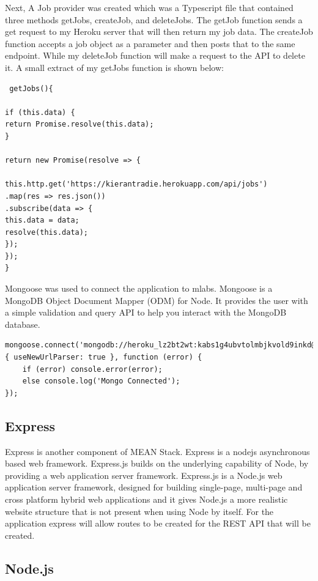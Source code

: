 Next, A Job provider was created which was a Typescript file that contained three methods getJobs, createJob, and deleteJobs. The getJob function sends a get request to my Heroku server that will then return my job data. The createJob function accepts a job object as a parameter and then posts that to the same endpoint. While my deleteJob function will make a request to the API to delete it. A small extract of my getJobs function is shown below:

\begin{verbatim}
 getJobs(){

if (this.data) {
return Promise.resolve(this.data);
}

return new Promise(resolve => {

this.http.get('https://kierantradie.herokuapp.com/api/jobs')
.map(res => res.json())
.subscribe(data => {
this.data = data;
resolve(this.data);
});
});
}
\end{verbatim}

Mongoose was used to connect the application to mlabs. Mongoose is a MongoDB Object Document Mapper (ODM) for Node. It provides the user with a simple validation and query API to help you interact with the MongoDB database.

\begin{verbatim}
mongoose.connect('mongodb://heroku_lz2bt2wt:kabs1g4ubvtolmbjkvold9inkd@ds227185.mlab.com:27185/heroku_lz2bt2wt',{ useNewUrlParser: true }, function (error) {
    if (error) console.error(error);
    else console.log('Mongo Connected');
});
\end{verbatim}


\subsection{Express}
Express is another component of MEAN Stack. Express is a nodejs asynchronous based web framework. Express.js builds on the underlying capability of Node, by providing a web application server framework. Express.js is a Node.js web application server framework, designed for building single-page, multi-page and cross platform hybrid web applications and it gives Node.js a more realistic website structure that is not present when using Node by itself. For the application express will allow routes to be created for the REST API that will be created.\cite{expressjs}
\subsection{Node.js}

